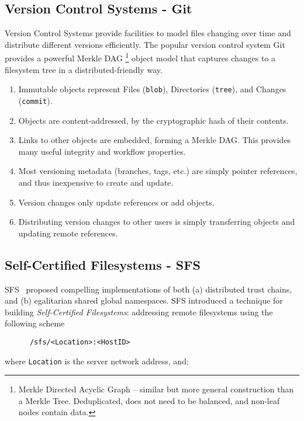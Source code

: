 \documentclass{sig-alternate}
\begin{document}
\subsection{Version Control Systems - Git}

Version Control Systems provide facilities to model files changing over time and distribute different versions efficiently. The popular version control system Git provides a powerful Merkle DAG \footnote{Merkle Directed Acyclic Graph -- similar but more general construction than a Merkle Tree. Deduplicated, does not need to be balanced, and non-leaf nodes contain data.} object model that captures changes to a filesystem tree in a distributed-friendly way.

\begin{enumerate}
  \item Immutable objects represent Files (\texttt{blob}), Directories (\texttt{tree}), and Changes (\texttt{commit}).
  \item Objects are content-addressed, by the cryptographic hash of their contents.
  \item Links to other objects are embedded, forming a Merkle DAG. This
  provides many useful integrity and workflow properties.
  \item Most versioning metadata (branches, tags, etc.) are simply pointer references, and thus inexpensive to create and update.
  \item Version changes only update references or add objects.
  \item Distributing version changes to other users is simply transferring objects and updating remote references.
\end{enumerate}

\subsection{Self-Certified Filesystems - SFS}

SFS~\cite{mazieres98, mazieres00} proposed compelling implementations of both (a) distributed trust chains, and (b) egalitarian shared global namespaces. SFS introduced a technique for building \textit{Self-Certified Filesystems}: addressing remote filesystems using the following scheme

\begin{verbatim}
      /sfs/<Location>:<HostID>
\end{verbatim}

\noindent where \texttt{Location} is the server network address, and:
\end{document}
